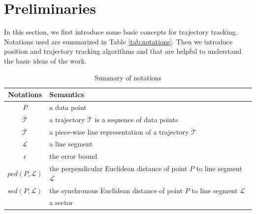 



\section{Preliminaries}
\label{sec-pre}

In this section, we first introduce some basic concepts for trajectory tracking.
Notations used are summarized in Table \ref{tab:notations}.
Then we introduce position and trajectory tracking algorithms \ldr and \ldrh that are helpful to understand the basic ideas of the work.

\begin{table}
	\renewcommand{\arraystretch}{1.20}
	\vspace{-2ex}
	\caption{\small Summary of notations}
	\centering
	\footnotesize
	\begin{tabular}{|c|l|}
		\hline
		{\bf Notations}& {\bf Semantics}   \\		\hline %
		$P$ & a data point \\		\hline
		$\dddot{\mathcal{T}}$ & a trajectory $\dddot{\mathcal{T}}$ is a sequence of data points\\		\hline
		$\overline{\mathcal{T}}$&  {a piece-wise line representation of a trajectory $\dddot{\mathcal{T}}$}	\\		\hline
		$\mathcal{L}$ & a line segment  \\		\hline
		$\epsilon$ & the error bound \\		\hline
		$ped\left(P, \mathcal{L}\right)$ &  {the perpendicular Euclidean distance of point $P$ to line segment $\mathcal{L}$}	\\	\hline
		$sed\left(P, \mathcal{L}\right)$ & {the synchronous Euclidean distance of point $P$ to line segment $\mathcal{L}$} 	\\		\hline
		\sector{} & a sector \\		\hline

\end{tabular}
\end{table}
